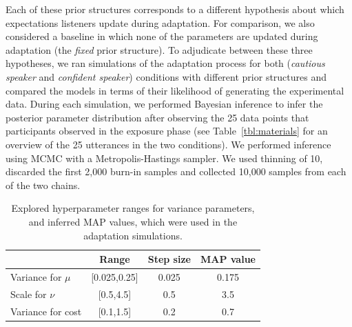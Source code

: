 Each of these prior structures corresponds to a different hypothesis about which expectations listeners update during adaptation. For comparison, we also considered a baseline in which none of the parameters are updated during adaptation (the {\it fixed} prior structure). To adjudicate between these three hypotheses, we ran simulations of the adaptation process for both (\textit{cautious speaker} and \textit{confident speaker}) conditions with different prior structures and compared the models in terms of their likelihood of generating the experimental data. During each simulation, we performed Bayesian inference to infer the posterior parameter distribution after observing the 25 data points that participants observed in the exposure phase (see Table~\ref{tbl:materials} for an overview of the 25 utterances in the two conditions). We performed inference using MCMC with a Metropolis-Hastings sampler. We used thinning of 10, discarded the first 2,000 burn-in samples and collected 10,000 samples from each of the two chains.

\begin{table}
\center
\begin{tabular}{l | c | c | c  }
 & Range &  Step size & MAP value  \\ \midrule
Variance for $\mu$ & [0.025,0.25] & 0.025 & 0.175  \\
Scale for $\nu$  & [0.5,4.5]  & 0.5   & 3.5  \\
Variance for cost & [0.1,1.5] & 0.2 & 0.7  \\
\end{tabular}
\caption{Explored hyperparameter ranges for variance parameters, and inferred MAP values, which were used in the adaptation simulations.  \label{tbl:hyperparams}}
\end{table}


